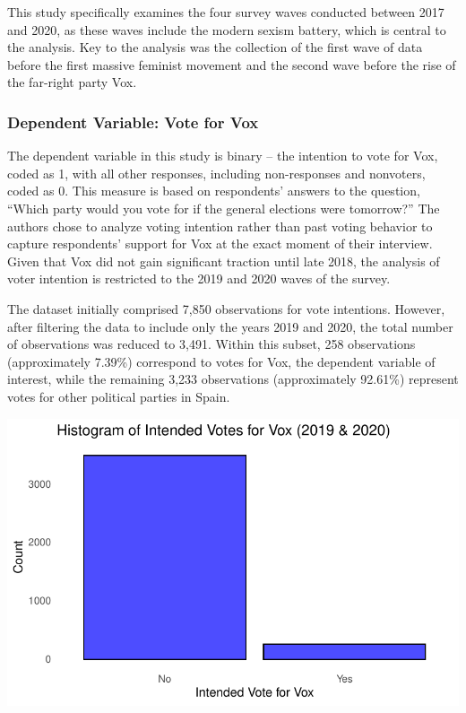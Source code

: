 \documentclass[
  letterpaper,
  DIV=11,
  numbers=noendperiod]{scrartcl}
\begin{document}
This study specifically examines the four survey waves conducted between
2017 and 2020, as these waves include the modern sexism battery, which
is central to the analysis. Key to the analysis was the collection of
the first wave of data before the first massive feminist movement and
the second wave before the rise of the far-right party Vox.

\subsubsection{Dependent Variable: Vote for
Vox}\label{dependent-variable-vote-for-vox}

The dependent variable in this study is binary -- the intention to vote
for Vox, coded as 1, with all other responses, including non-responses
and nonvoters, coded as 0. This measure is based on respondents' answers
to the question, ``Which party would you vote for if the general
elections were tomorrow?'' The authors chose to analyze voting intention
rather than past voting behavior to capture respondents' support for Vox
at the exact moment of their interview. Given that Vox did not gain
significant traction until late 2018, the analysis of voter intention is
restricted to the 2019 and 2020 waves of the survey.

The dataset initially comprised 7,850 observations for vote intentions.
However, after filtering the data to include only the years 2019 and
2020, the total number of observations was reduced to 3,491. Within this
subset, 258 observations (approximately 7.39\%) correspond to votes for
Vox, the dependent variable of interest, while the remaining 3,233
observations (approximately 92.61\%) represent votes for other political
parties in Spain.

\includegraphics{reprod_sexism_files/figure-pdf/unnamed-chunk-3-1.pdf}
\end{document}
